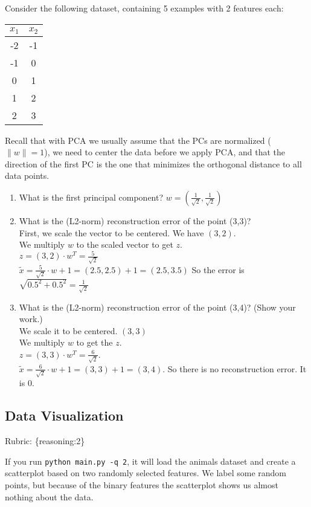 \documentclass{article}
\def\rubric#1{\gre{Rubric: \{#1\}}}{}
\def\blu#1{{\color{blu}#1}}
\def\gre#1{{\color{gre}#1}}
\def\norm#1{\|#1\|}
\def\enum#1{\begin{enumerate}#1\end{enumerate}}
\begin{document}
Consider the following dataset, containing 5 examples with 2 features each:
\begin{center}
\begin{tabular}{cc}
$x_1$ & $x_2$\\
\hline
-2 & -1\\
-1 & 0\\
0 & 1\\
1 & 2\\
2 & 3\\
\end{tabular}
\end{center}
Recall that with PCA we usually assume that the PCs are normalized ($\norm{w} = 1$), we need to center the data before we apply PCA, and that the direction of the first PC is the one that minimizes the orthogonal distance to all data points.
\blu{
\enum{
\item What is the first principal component?
\gre{$w=(\frac{1}{\sqrt{2}},\frac{1}{\sqrt{2}})$}
\item What is the (L2-norm) reconstruction error of the point (3,3)? \\
\gre{First, we scale the vector to be centered. We have $(3,2)$.\\
We multiply $w$ to the scaled vector to get $z$.\\ $z=(3,2)\cdot w^T=\frac{5}{\sqrt{2}} $\\
$\widetilde{x}=\frac{5}{\sqrt{2}} \cdot w+1=(2.5,2.5)+1=(2.5,3.5)$ So the error is $\sqrt{0.5^2+0.5^2}=\frac{1}{\sqrt{2}}$}
\item What is the (L2-norm) reconstruction error of the point (3,4)? (Show your work.)\\
\gre{We scale it to be centered. $(3,3)$\\ We multiply $w$ to get the $z$.\\$z=(3,3)\cdot w^T=\frac{6}{\sqrt{2}}$.\\
$\widetilde{x}=\frac{6}{\sqrt{2}} \cdot w+1=(3,3)+1=(3,4)$.
So there is no reconstruction error. It is $0$.
}
}
}

\subsection{Data Visualization}
\rubric{reasoning:2}

If you run \verb|python main.py -q 2|, it will load the animals dataset and create a scatterplot based on two randomly selected features.
We label some random points, but because of the binary features the scatterplot shows us almost nothing about the data.
\end{document}
